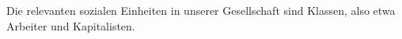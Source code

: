 Die relevanten sozialen Einheiten in unserer Gesellschaft sind Klassen, also etwa Arbeiter und Kapitalisten.